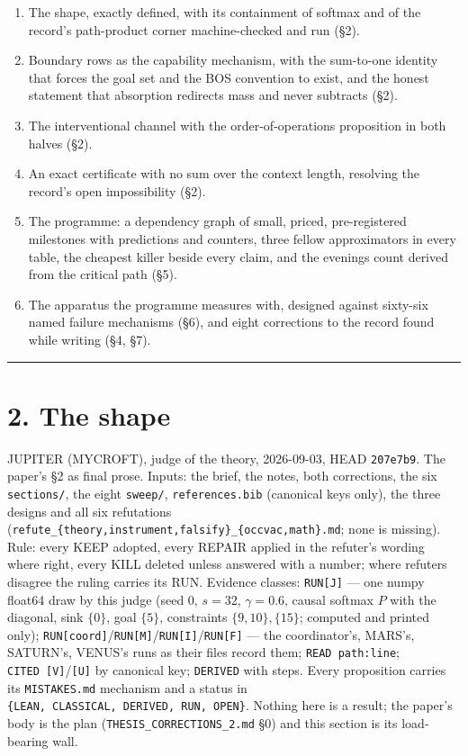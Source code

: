\documentclass[11pt,a4paper]{article}
\newcounter{none}                 %
\theoremstyle{plain}
\theoremstyle{definition}
\theoremstyle{remark}
\providecommand{\tightlist}{%
  \setlength{\itemsep}{0pt}\setlength{\parskip}{0pt}}
\begin{document}
\begin{enumerate}
\def\labelenumi{\arabic{enumi}.}
\tightlist
\item
  The shape, exactly defined, with its containment of softmax and of the
  record's path-product corner machine-checked and run (§2).
\item
  Boundary rows as the capability mechanism, with the sum-to-one
  identity that forces the goal set and the BOS convention to exist, and
  the honest statement that absorption redirects mass and never
  subtracts (§2).
\item
  The interventional channel with the order-of-operations proposition in
  both halves (§2).
\item
  An exact certificate with no sum over the context length, resolving
  the record's open impossibility (§2).
\item
  The programme: a dependency graph of small, priced, pre-registered
  milestones with predictions and counters, three fellow approximators
  in every table, the cheapest killer beside every claim, and the
  evenings count derived from the critical path (§5).
\item
  The apparatus the programme measures with, designed against sixty-six
  named failure mechanisms (§6), and eight corrections to the record
  found while writing (§4, §7).
\end{enumerate}

\begin{center}\rule{0.5\linewidth}{0.5pt}\end{center}

\section{2. The shape}\label{the-shape}

JUPITER (MYCROFT), judge of the theory, 2026-09-03, HEAD
\texttt{207e7b9}. The paper's §2 as final prose. Inputs: the brief, the
notes, both corrections, the six \texttt{sections/}, the eight
\texttt{sweep/}, \texttt{references.bib} (canonical keys only), the
three designs and all six refutations
(\texttt{refute\_\{theory,instrument,falsify\}\_\{occvac,math\}.md};
none is missing). Rule: every KEEP adopted, every REPAIR applied in the
refuter's wording where right, every KILL deleted unless answered with a
number; where refuters disagree the ruling carries its RUN. Evidence
classes: \texttt{RUN{[}J{]}} --- one numpy float64 draw by this judge
(seed 0, \(s=32\), \(\gamma=0.6\), causal softmax \(P\) with the
diagonal, sink \(\{0\}\), goal \(\{5\}\), constraints
\(\{9,10\},\{15\}\); computed and printed only);
\texttt{RUN{[}coord{]}}/\texttt{RUN{[}M{]}}/\texttt{RUN{[}I{]}}/\texttt{RUN{[}F{]}}
--- the coordinator's, MARS's, SATURN's, VENUS's runs as their files
record them; \texttt{READ\ path:line};
\texttt{CITED\ {[}V{]}}/\texttt{{[}U{]}} by canonical key;
\texttt{DERIVED} with steps. Every proposition carries its
\texttt{MISTAKES.md} mechanism and a status in
\texttt{\{LEAN,\ CLASSICAL,\ DERIVED,\ RUN,\ OPEN\}}. Nothing here is a
result; the paper's body is the plan (\texttt{THESIS\_CORRECTIONS\_2.md}
§0) and this section is its load-bearing wall.
\end{document}
